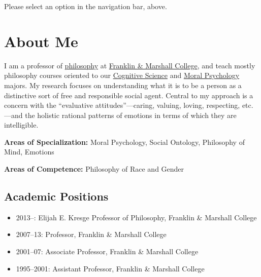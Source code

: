 \documentclass[%
  11pt,%
]{article}
\begin{document}

\tableofcontents

\ifdefined\HCode

    \begin{center}
      Please select an option in the navigation bar, above.

    \end{center}
\else
\fi

\section{About Me}

I am a professor of \href{https://www.fandm.edu/fields-of-study/philosophy/index.html}{philosophy} at \href{www.fandm.edu}{Franklin \& Marshall College}, and teach mostly philosophy courses oriented to our \href{https://www.fandm.edu/fields-of-study/cognitive-science/index.html}{Cognitive Science} and \href{https://www.fandm.edu/fields-of-study/moral-psychology/index.html}{Moral Psychology} majors. My research focuses on understanding what it is to be a person as a distinctive sort of free and responsible social agent. Central to my approach is a concern with the \enquote{evaluative attitudes}---caring, valuing, loving, respecting, etc.---and the holistic rational patterns of emotions in terms of which they are intelligible.

\noindent\textbf{Areas of Specialization:} Moral Psychology, Social Ontology, Philosophy of Mind, Emotions

\noindent\textbf{Areas of Competence:} Philosophy of Race and Gender

\subsection{Academic Positions}

\begin{itemize}
  \item 2013--: Elijah E. Kresge Professor of Philosophy, Franklin \& Marshall College
  \item 2007--13: Professor, Franklin \& Marshall College
  \item 2001--07: Associate Professor, Franklin \& Marshall College
  \item 1995--2001: Assistant Professor, Franklin \& Marshall College
\end{itemize}
\end{document}
